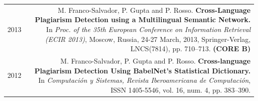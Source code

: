 \documentclass[10pt]{article}
\begin{document}
\begin{tabular}{L!{\VRule}R}
	2013&M. Franco-Salvador, P. Gupta and P. Rosso. \textbf{Cross-Language Plagiarism Detection using a Multilingual Semantic Network.}
	In \emph{Proc. of the 35th European Conference on Information Retrieval (ECIR 2013)}, Moscow, Russia, 24-27 March, 2013, Springer-Verlag, LNCS(7814), pp. 710--713. \textbf{(CORE B)}\vspace{5pt}\\
	2012&M. Franco-Salvador, P. Gupta and P. Rosso. \textbf{Cross-language Plagiarism Detection Using BabelNet's Statistical Dictionary.}
	In \emph{Computaci{\'o}n y Sistemas, Revista Iberoamericana de Computaci{\'o}n}, ISSN 1405-5546, vol. 16, num. 4, pp. 383--390.\vspace{5pt}\\
\end{tabular}
\end{document}
